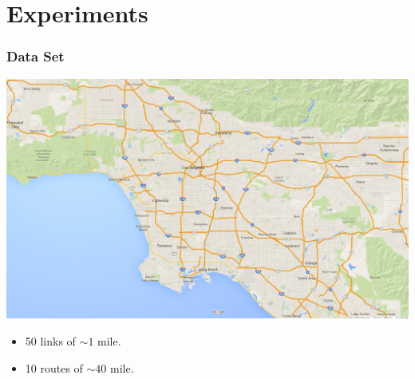 \documentclass[t]{beamer}
\begin{document}
\section{Experiments}

\begin{frame}\frametitle{Data Set}
\vspace{-0.25in}
\begin{center}
	\includegraphics[scale=0.16]{LA-map.jpg}
\end{center}
\begin{itemize}
\item<2-> 50 links of $\sim 1$ mile.
\item<3-> 10 routes of $\sim 40$ mile.
\end{itemize}
\end{frame}
\end{document}
